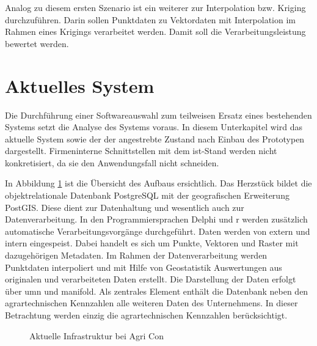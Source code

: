 Analog zu diesem ersten Szenario ist ein weiterer zur Interpolation bzw. Kriging durchzuführen.
Darin sollen Punktdaten zu Vektordaten mit Interpolation im Rahmen eines Krigings verarbeitet werden.
Damit soll die Verarbeitungsleistung bewertet werden.




\section{Aktuelles System}
\label{IstStand}

Die Durchführung einer Softwareauswahl zum teilweisen Ersatz eines bestehenden Systems setzt die Analyse des Systems voraus.
In diesem Unterkapitel wird das aktuelle System sowie der der angestrebte Zustand nach Einbau des Prototypen dargestellt.
Firmeninterne Schnittstellen mit dem ist-Stand werden nicht konkretisiert, da sie den Anwendungsfall nicht schneiden.

In Abbildung \ref{fig:iststand} ist die Übersicht des Aufbaus ersichtlich.
Das Herzstück bildet die objektrelationale Datenbank PostgreSQL mit der geografischen Erweiterung PostGIS.
Diese dient zur Datenhaltung und wesentlich auch zur Datenverarbeitung.
In den Programmiersprachen Delphi und \Gls{r} werden zusätzlich automatische Verarbeitungsvorgänge durchgeführt.
Daten werden von extern und intern eingespeist.
Dabei handelt es sich um Punkte, Vektoren und Raster mit dazugehörigen Metadaten.
Im Rahmen der Datenverarbeitung werden Punktdaten interpoliert und mit Hilfe von Geostatistik Auswertungen aus originalen und verarbeiteten Daten erstellt.
Die Darstellung der Daten erfolgt über \Gls{umn} und \Gls{manifold}.
Als zentrales Element enthält die Datenbank neben den agrartechnischen Kennzahlen alle weiteren Daten des Unternehmens. In dieser Betrachtung werden einzig die agrartechnischen Kennzahlen berücksichtigt.
\begin{figure}[h]
\centering

\caption[Aktuelle Infrastruktur bei Agri Con]{Aktuelle Infrastruktur bei Agri Con}
\label{fig:iststand}
\end{figure}
%
\label{iststand-vorgaenge}

